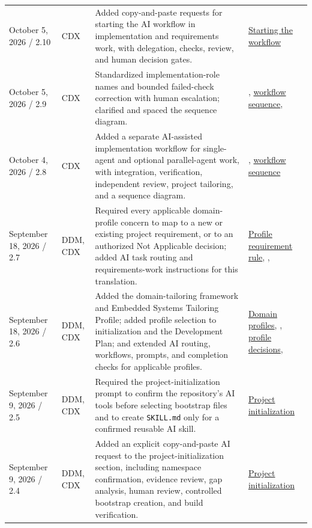 \begin{tabularx}{\linewidth}{L{3.1cm}L{2.2cm}YL{2.0cm}}
October 5, 2026 / 2.10 & CDX & Added copy-and-paste requests for starting the AI workflow in implementation and requirements work, with delegation, checks, review, and human decision gates. & \hyperref[Section:AIImplementationStart]{Starting the workflow}\\
October 5, 2026 / 2.9 & CDX & Standardized implementation-role names and bounded failed-check correction with human escalation; clarified and spaced the sequence diagram. & , \hyperref[Figure:AIImplementationSequence]{workflow sequence}, \\
October 4, 2026 / 2.8 & CDX & Added a separate AI-assisted implementation workflow for single-agent and optional parallel-agent work, with integration, verification, independent review, project tailoring, and a sequence diagram. & , \hyperref[Figure:AIImplementationSequence]{workflow sequence}\\
September 18, 2026 / 2.7 & DDM, CDX & Required every applicable domain-profile concern to map to a new or existing project requirement, or to an authorized Not Applicable decision; added AI task routing and requirements-work instructions for this translation. & \hyperref[Section:DomainProfileRequirements]{Profile requirement rule}, , \\
September 18, 2026 / 2.6 & DDM, CDX & Added the domain-tailoring framework and Embedded Systems Tailoring Profile; added profile selection to initialization and the Development Plan; and extended AI routing, workflows, prompts, and completion checks for applicable profiles. & \hyperref[Section:DomainProfiles]{Domain profiles}, , \hyperref[Section:DevelopmentPlanProfiles]{profile decisions}, \\
September 9, 2026 / 2.5 & DDM, CDX & Required the project-initialization prompt to confirm the repository's AI tools before selecting bootstrap files and to create \texttt{SKILL.md} only for a confirmed reusable AI skill. & \hyperref[Section:InitializeNewProject]{Project initialization}\\
September 9, 2026 / 2.4 & DDM, CDX & Added an explicit copy-and-paste AI request to the project-initialization section, including namespace confirmation, evidence review, gap analysis, human review, controlled bootstrap creation, and build verification. & \hyperref[Section:InitializeNewProject]{Project initialization}\\

\end{tabularx}

